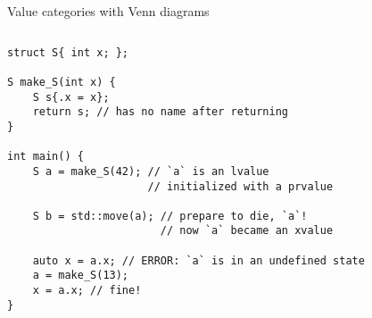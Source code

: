 \begin{frame}[fragile]{Value categories with Venn diagrams}
    \begin{center}
    \end{center}
    \begin{columns}
        \begin{column}{.7\textwidth}
            \begin{lstlisting}
struct S{ int x; };

S make_S(int x) {
    S s{.x = x};
    return s; // has no name after returning
}

int main() {
    S a = make_S(42); // `a` is an lvalue
                      // initialized with a prvalue

    S b = std::move(a); // prepare to die, `a`!
                        // now `a` became an xvalue

    auto x = a.x; // ERROR: `a` is in an undefined state
    a = make_S(13);
    x = a.x; // fine!
}
            \end{lstlisting}
        \end{column}
        \begin{column}{.25\textwidth}
        \end{column}
    \end{columns}
\end{frame}

